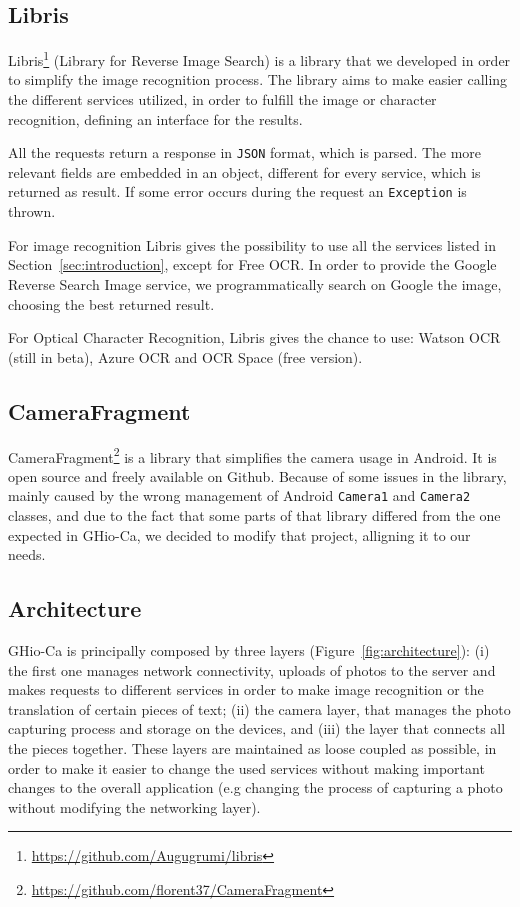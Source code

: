 \subsection{Libris}
Libris\footnote{\url{https://github.com/Augugrumi/libris}} (Library for Reverse
Image Search) is a library that we developed in order to simplify the image 
recognition process. The library aims to make easier calling the different 
services utilized, in order to fulfill the image or character recognition, 
defining an interface for the results.

All the requests return a response in \texttt{JSON} format, which is parsed.
The more relevant fields are embedded in an object, different for every
service, which is returned as result. If some error occurs during the request an
\texttt{Exception} is thrown.

For image recognition Libris gives the possibility to use all the services
listed in Section~\ref{sec:introduction}, except for Free OCR. In order to
provide the Google Reverse Search Image service, we programmatically search on
Google the image, choosing the best returned result.

For Optical Character Recognition, Libris gives the chance to use: Watson OCR (still in
beta), Azure OCR and OCR Space (free version).

\subsection{CameraFragment}
CameraFragment\footnote{\url{https://github.com/florent37/CameraFragment}} is a
library that simplifies the camera usage in Android. It is open source and freely 
available on Github. Because of some issues in the library, mainly caused by 
the wrong management of Android \texttt{Camera1} and \texttt{Camera2} classes, and due 
to the fact that some parts of that library differed from the one expected in 
GHio-Ca, we decided to modify that project, alligning it to our needs.

\subsection{Architecture}
GHio-Ca is principally composed by three layers (Figure~\ref{fig:architecture}):
(i) the first one manages network connectivity, uploads of photos to the server
and makes requests to different services in order to make image recognition
or the translation of certain pieces of text; (ii) the camera layer, that
manages the photo capturing process and storage on the devices, and (iii) the
layer that connects all the pieces together.
These layers are maintained as loose coupled as possible, in order to make it
easier to change the used services without making important changes to the overall
application (e.g changing the process of capturing a photo without modifying the
networking layer).

